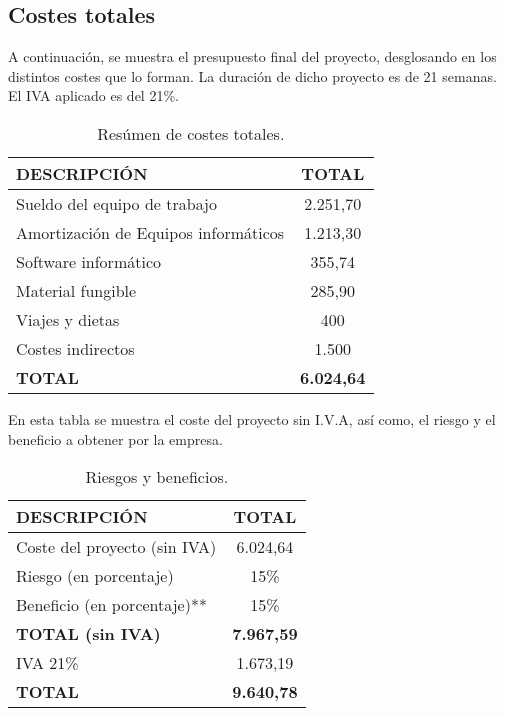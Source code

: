 \subsection{Costes totales}
\par A continuación, se muestra el presupuesto final del proyecto, desglosando en los distintos costes que lo forman. La duración de dicho proyecto es de 21 semanas. El IVA aplicado es del 21\%.

\begin{table}[H]
\begin{center}
\begin{tabular}{l c}
\textbf{DESCRIPCIÓN} & \textbf{TOTAL}\\ \hline \hline
Sueldo del equipo de trabajo & 2.251,70\\
Amortización de Equipos informáticos & 1.213,30\\
Software informático & 355,74\\
Material fungible & 285,90\\
Viajes y dietas & 400\\
Costes indirectos & 1.500\\ \hline \hline
\textbf{TOTAL} & \textbf{6.024,64}\\ \hline
\end{tabular}
\caption{Resúmen de costes totales.}
\label{tab:resumenTotal}
\end{center}
\end{table}

En esta tabla se muestra el coste del proyecto sin I.V.A, así como, el riesgo y el beneficio a obtener por la empresa.
\begin{table}[H]
\begin{center}
\begin{tabular}{l c}
\textbf{DESCRIPCIÓN} & \textbf{TOTAL}\\ \hline \hline
Coste del proyecto (sin IVA) &  6.024,64\\
Riesgo (en porcentaje) & 15\% \\
Beneficio (en porcentaje)** & 15\% \\ \hline \hline
\textbf{TOTAL (sin IVA)} & \textbf{7.967,59}\\ \hline \hline
IVA 21\% & 1.673,19 \\\hline \hline
\textbf{TOTAL} &  \textbf{9.640,78}\\ \hline
\end{tabular}
\caption{Riesgos y beneficios.}
\label{tab:total}
\end{center}
\end{table}
